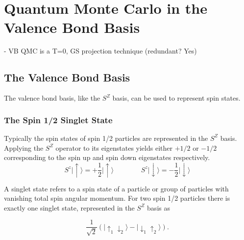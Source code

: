 \chapter{Quantum Monte Carlo in the Valence Bond Basis}

{\color{red} - VB QMC is a T=0, GS projection technique (redundant? Yes)}
\\
\section{The Valence Bond Basis}

{\color{red} The valence bond basis, like the $S^Z$ basis, can be used to represent spin states.}

\subsection{The Spin 1/2 Singlet State}


Typically the spin states of spin 1/2 particles are represented in the $S^Z$ basis.  Applying the
$S^Z$ operator to its eigenstates yields either $+1/2$ or $-1/2$ corresponding to the spin up
and spin down eigenstates respectively.
\begin{equation}
   S^z\lvert \uparrow \rangle = +\frac{1}{2} \lvert \uparrow \rangle
   \:\:\:    \:\:\:    \:\:\:    \:\:\:    \:\:\:    \:\:\: 
   S^z\lvert \downarrow \rangle = -\frac{1}{2} \lvert \downarrow \rangle
   \label{SZ}
\end{equation}

A singlet state refers to a spin state of a particle or group of particles with vanishing total spin angular momentum.
For two spin 1/2 particles there is exactly one singlet state, represented in the $S^Z$ basis as

\begin{equation}
  \frac{1}{\sqrt{2}}\left( \lvert \uparrow_1 \downarrow_2 \rangle - \lvert \downarrow_1 \uparrow_2 \rangle \right) .
   \label{singlet}
\end{equation}

